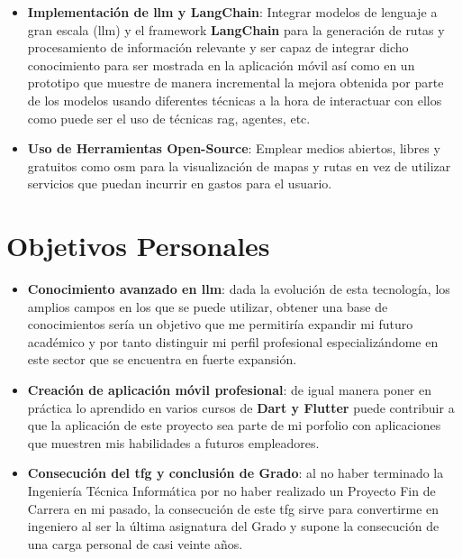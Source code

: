 \begin{itemize}
    \item \textbf{Implementación de \acrfull{llm} y \textbf{LangChain}}: Integrar modelos de lenguaje a gran escala (\acrshort{llm}) y el framework \textbf{LangChain} para la generación de rutas y procesamiento de información relevante y ser capaz de integrar dicho conocimiento para ser mostrada en la aplicación móvil así como en un prototipo que muestre de manera incremental la mejora obtenida por parte de los modelos usando diferentes técnicas a la hora de interactuar con ellos como puede ser el uso de técnicas \acrfull{rag}, agentes, etc.
    \item \textbf{Uso de Herramientas Open-Source}: Emplear medios abiertos, libres y gratuitos como \acrfull{osm} para la visualización de mapas y rutas en vez de utilizar servicios que puedan incurrir en gastos para el usuario. 
\end{itemize}

\section{Objetivos Personales}

\begin{itemize}
	\item \textbf{Conocimiento avanzado en \acrshort{llm}}: dada la evolución de esta tecnología, los amplios campos en los que se puede utilizar, obtener una base de conocimientos sería un objetivo que me permitiría expandir mi futuro académico y por tanto distinguir mi perfil profesional especializándome en este sector que se encuentra en fuerte expansión.
	\item \textbf{Creación de aplicación móvil profesional}: de igual manera poner en práctica lo aprendido en varios cursos de \textbf{Dart y Flutter} puede contribuir a que la aplicación de este proyecto sea parte de mi porfolio con aplicaciones que muestren mis habilidades a futuros empleadores.
	\item \textbf{Consecución del \acrshort{tfg} y conclusión de Grado}: al no haber terminado la Ingeniería Técnica Informática por no haber realizado un Proyecto Fin de Carrera en mi pasado, la consecución de este \acrshort{tfg} sirve para convertirme en ingeniero al ser la última asignatura del Grado y supone la consecución de una carga personal de casi veinte años.
\end{itemize}
